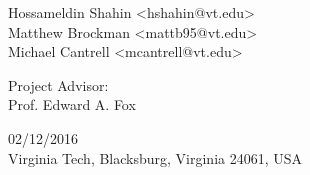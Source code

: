 \begin{titlepage}
\begin{center}
{    }
    \vspace{0.2cm}
    {\large
      Hossameldin Shahin <hshahin@vt.edu>\\
      Matthew Brockman <mattb95@vt.edu>\\
      Michael Cantrell <mcantrell@vt.edu>\\
    }
  \end{center}
  \vfill
  \begin{center}
    {\Large
      Project Advisor:\\
    }
    \vspace{0.2cm}
    {\large
      Prof. Edward A. Fox\\
    }
  \end{center}
  \vfill
  \begin{center}
    {\Large
      02/12/2016\\
      Virginia Tech, Blacksburg, Virginia 24061, USA\\
    }
  \end{center}
\end{titlepage}
\clearpage